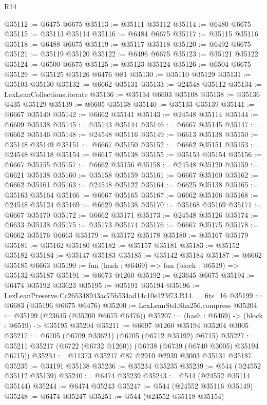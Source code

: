 \begin{lexlean}{R14}
\begin{coremodule}
@35112 := @6475 @6675
@35113 := @35111 @35112
@35114 := @6480 @6675
@35115 := @35113 @35114
@35116 := @6484 @6675
@35117 := @35115 @35116
@35118 := @6488 @6675
@35119 := @35117 @35118
@35120 := @6492 @6675
@35121 := @35119 @35120
@35122 := @6496 @6675
@35123 := @35121 @35122
@35124 := @6500 @6675
@35125 := @35123 @35124
@35126 := @6504 @6675
@35129 := @35125 @35126 @6476 @81
@35130 := @35110 @35129
@35131 := @35103 @35130
@35132 := @6662 @35131
@35133 := @24548 @35112
@35134 := LexLeanCollections.iterate
@35136 := @35134 @6603 @35108
@35138 := @35136 @435 @35129
@35139 := @6605 @35138
@35140 := @35133 @35139
@35141 := @6667 @35140
@35142 := @6662 @35141
@35143 := @24548 @35114
@35144 := @6609 @35138
@35145 := @35143 @35144
@35146 := @6667 @35145
@35147 := @6662 @35146
@35148 := @24548 @35116
@35149 := @6613 @35138
@35150 := @35148 @35149
@35151 := @6667 @35150
@35152 := @6662 @35151
@35153 := @24548 @35118
@35154 := @6617 @35138
@35155 := @35153 @35154
@35156 := @6667 @35155
@35157 := @6662 @35156
@35158 := @24548 @35120
@35159 := @6621 @35138
@35160 := @35158 @35159
@35161 := @6667 @35160
@35162 := @6662 @35161
@35163 := @24548 @35122
@35164 := @6625 @35138
@35165 := @35163 @35164
@35166 := @6667 @35165
@35167 := @6662 @35166
@35168 := @24548 @35124
@35169 := @6629 @35138
@35170 := @35168 @35169
@35171 := @6667 @35170
@35172 := @6662 @35171
@35173 := @24548 @35126
@35174 := @6633 @35138
@35175 := @35173 @35174
@35176 := @6667 @35175
@35178 := @6662 @35176 @6663
@35179 := @35172 @35178
@35180 := @35167 @35179
@35181 := @35162 @35180
@35182 := @35157 @35181
@35183 := @35152 @35182
@35184 := @35147 @35183
@35185 := @35142 @35184
@35187 := @6662 @35185 @6663
@35190 := fun (hash : @6469) => fun (block : @6519) => @35132 @35187
@35191 := @6673 @1260
@35192 := @23645 @6675
@35194 := @6474 @35192 @33623
@35195 := @35191 @35194
@35196 := LexLeanPreserve.Cc265348943ac75b534ad14c10e123f73.R14.__fits_16
@35199 := @6683 (@35196 @6675 @6476)
@35200 := LexLeanStd.Sha256.compress
@35204 := @35199 (@23645 (@35200 @6675 @6476))
@35207 := (hash : @6469) -> (block : @6519) -> @35195 @35204
@35211 := @6697 @1260 @35194 @35204 @3005
@35217 := @6705 (@6709 @33621) (@6705 (@6712 @35192) @6715)
@35227 := @35211 @35217 (@6722 (@6732 @1260)) (@6738 (@6739 (@6740 @3005) @35194 @6715))
@35234 := @11373 @35217 @87 @2910 @2939 @3003 @35131 @35187
@35235 := @34191 @35138
@35236 := @35234 @35235
@35239 := @544 (@24552 @35112 @35139)
@35240 := @6474 @35239
@35243 := @544 (@24552 @35114 @35144)
@35244 := @6474 @35243
@35247 := @544 (@24552 @35116 @35149)
@35248 := @6474 @35247
@35251 := @544 (@24552 @35118 @35154)

\end{coremodule}
\end{lexlean}
